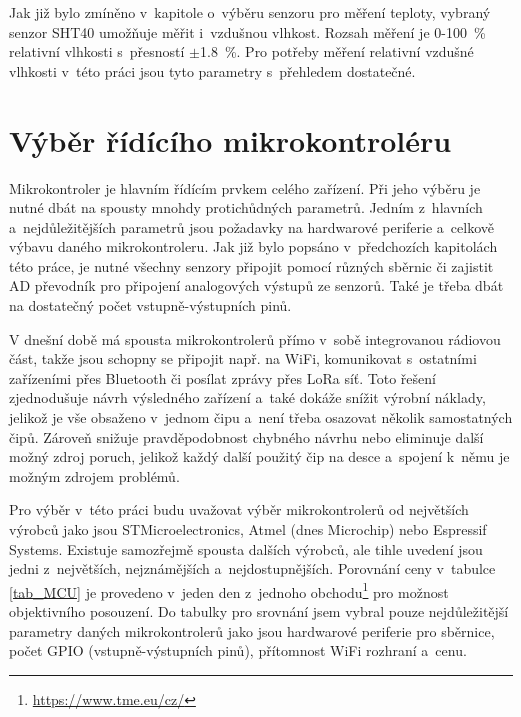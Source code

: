 Jak již bylo zmíněno v~kapitole o~výběru senzoru pro měření teploty, vybraný senzor SHT40 umožňuje měřit i~vzdušnou vlhkost. Rozsah měření je \SI{0}{}-\SI{100}{\percent} relativní vlhkosti s~přesností $\pm$\SI{1,8}{\percent}. Pro potřeby měření relativní vzdušné vlhkosti v~této práci jsou tyto parametry s~přehledem dostatečné.

\section{Výběr řídícího mikrokontroléru}

Mikrokontroler je hlavním řídícím prvkem celého zařízení. Při jeho výběru je nutné dbát na spousty mnohdy protichůdných parametrů. Jedním z~hlavních a~nejdůležitějších parametrů jsou požadavky na hardwarové periferie a~celkově výbavu daného mikrokontroleru. Jak již bylo popsáno v~předchozích kapitolách této práce, je nutné všechny senzory připojit pomocí různých sběrnic či zajistit AD převodník pro připojení analogových výstupů ze senzorů. Také je třeba dbát na dostatečný počet vstupně-výstupních pinů.

V dnešní době má spousta mikrokontrolerů přímo v~sobě integrovanou rádiovou část, takže jsou schopny se připojit např. na WiFi, komunikovat s~ostatními zařízeními přes Bluetooth či posílat zprávy přes LoRa síť. Toto řešení zjednodušuje návrh výsledného zařízení a~také dokáže snížit výrobní náklady, jelikož je vše obsaženo v~jednom čipu a~není třeba osazovat několik samostatných čipů. Zároveň snižuje pravděpodobnost chybného návrhu nebo eliminuje další možný zdroj poruch, jelikož každý další použitý čip na desce a~spojení k~němu je možným zdrojem problémů.

Pro výběr v~této práci budu uvažovat výběr mikrokontrolerů od největších výrobců jako jsou STMicroelectronics, Atmel (dnes Microchip) nebo Espressif Systems. Existuje samozřejmě spousta dalších výrobců, ale tihle uvedení jsou jedni z~největších, nejznámějších a~nejdostupnějších. Porovnání ceny v~tabulce \ref{tab_MCU} je provedeno v~jeden den z~jednoho obchodu\footnote{\url{https://www.tme.eu/cz/}} pro možnost objektivního posouzení. Do tabulky pro srovnání jsem vybral pouze nejdůležitější parametry daných mikrokontrolerů jako jsou hardwarové periferie pro sběrnice, počet GPIO (vstupně-výstupních pinů), přítomnost WiFi rozhraní a~cenu.


